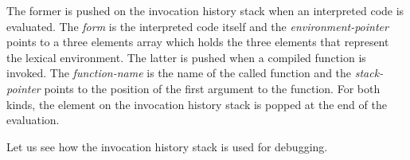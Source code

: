 \centerline{}

\vspace{1 em}

The former is pushed on the invocation history stack when an
interpreted code is evaluated.  The {\em form} is the interpreted code
itself and the {\em environment-pointer} points to a three elements
array which holds the three elements that represent the lexical
environment.  The latter is pushed when a compiled function is
invoked.  The {\em function-name} is the name of the called function
and the {\em stack-pointer} points to the position of the first
argument to the function.  For both kinds, the element on the
invocation history stack is popped at the end of the evaluation.

Let us see how the invocation history stack is used for debugging.

